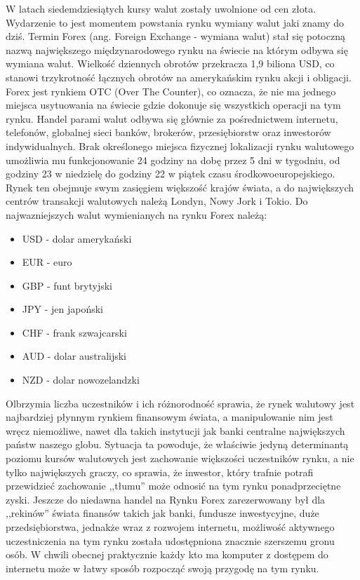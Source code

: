 \documentclass[pdflatex,11pt]{aghdpl}
\begin{document}
W latach siedemdziesiątych kursy walut zostały uwolnione od cen złota. Wydarzenie to jest momentem powstania rynku wymiany walut jaki znamy do dziś. Termin Forex (ang. Foreign Exchange - wymiana walut) stał się potoczną nazwą największego międzynarodowego rynku na świecie na którym odbywa się wymiana walut. Wielkość dziennych obrotów przekracza 1,9 biliona USD, co stanowi trzykrotność łącznych obrotów na amerykańskim rynku akcji i obligacji. Forex jest rynkiem OTC (Over The Counter), co oznacza, że nie ma jednego miejsca usytuowania na świecie gdzie dokonuje się wszystkich operacji na tym rynku. Handel parami walut odbywa się głównie za pośrednictwem internetu, telefonów, globalnej sieci banków, brokerów, przesiębiorstw oraz inwestorów indywidualnych. Brak określonego miejsca fizycznej lokalizacji rynku walutowego umożliwia mu funkcjonowanie 24 godziny na dobę przez 5 dni w tygodniu, od godziny 23 w niedzielę do godziny 22 w piątek czasu środkowoeuropejskiego. Rynek ten obejmuje swym zasięgiem większość krajów świata, a do największych centrów transakcji walutowych należą Londyn, Nowy Jork i Tokio. Do najwazniejszych walut wymienianych na rynku Forex należą:
\begin{itemize}
\item USD - dolar amerykański
\item EUR - euro
\item GBP - funt brytyjski
\item JPY - jen japoński
\item CHF - frank szwajcarski
\item AUD - dolar australijski
\item NZD - dolar nowozelandzki
\end{itemize}

Olbrzymia liczba uczestników i ich różnorodność sprawia, że rynek walutowy jest najbardziej płynnym rynkiem finansowym świata, a manipulowanie nim jest wręcz niemożliwe, nawet dla takich instytucji jak banki centralne największych państw naszego globu. Sytuacja ta powoduje, że właściwie jedyną determinantą poziomu kursów walutowych jest zachowanie większości uczestników rynku, a nie tylko największych graczy, co sprawia, że inwestor, który trafnie potrafi przewidzieć zachowanie ,,tłumu'' może odnosić na tym rynku ponadprzeciętne zyski.
Jeszcze do niedawna handel na Rynku Forex zarezerwowany był dla ,,rekinów'' świata finansów takich jak banki, fundusze inwestycyjne, duże przedsiębiorstwa, jednakże wraz z rozwojem internetu, możliwość aktywnego uczestniczenia na tym rynku została udostępniona znacznie szerszemu gronu osób. W chwili obecnej praktycznie każdy kto ma komputer z dostępem do internetu może w łatwy sposób rozpocząć swoją przygodę na tym rynku.
\end{document}
